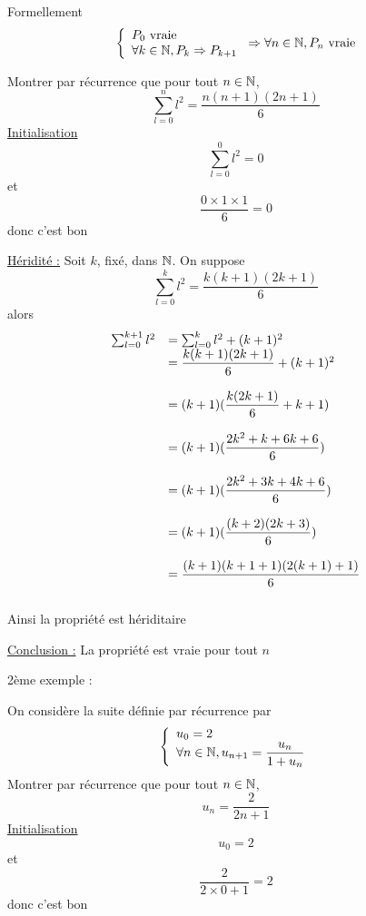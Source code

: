 Formellement 
$$\left\{\begin{array}{l} P_0 \text{ vraie} \\ \forall k \in \mathbb{N}, P_k \Rightarrow P_{k+1} \end{array}\right. \Rightarrow \forall n \in \mathbb{N}, P_n \text{ vraie}$$
\begin{exemples}
Montrer par récurrence que pour tout $n \in \mathbb{N}$, 
$$\sum_{l=0}^{n} l^2 = \dfrac{n(n+1)(2n+1)}{6}$$
\underline{Initialisation }
$$\sum_{l=0}^{0} l^2 = 0 $$
et 
$$\dfrac{0 \times 1 \times 1}{6} = 0$$
donc c'est bon\newline

\underline{Héridité :}\newline
Soit $k$, fixé, dans $\mathbb{N}$. On suppose 
$$\sum_{l=0}^{k} l^2 = \dfrac{k(k+1)(2k+1)}{6}$$
alors 
$$
\begin{array}{l l}
\sum_{l=0}^{k+1} l^2 &= \sum_{l=0}^{k} l^2 + (k+1)^2\\
&= \dfrac{k(k+1)(2k+1)}{6} + (k+1)^2\\ \\
&= (k+1)(\dfrac{k(2k+1)}{6} + k+1)\\ \\
&= (k+1)(\dfrac{2k^2 + k + 6 k +6}{6})\\ \\
&= (k+1)(\dfrac{2k^2 + 3k + 4k +6}{6})\\ \\
&= (k+1)(\dfrac{(k+2)(2k+3)}{6})\\ \\
&= \dfrac{(k+1)(k+1+1)(2(k+1)+1)}{6}\\ \\
\end{array}
$$
Ainsi la propriété est hériditaire\newline

\underline{Conclusion :}\newline 
La propriété est vraie pour tout $n$\newline

2ème exemple : \newline

On considère la suite définie par récurrence par 
$$\left\{ \begin{array}{l}
  u_0 = 2\\
  \forall n \in \mathbb{N}, u_{n+1} = \dfrac{u_n}{1+u_n}
\end{array}\right.$$
Montrer par récurrence que pour tout $n\in\mathbb{N}$, $$u_n = \dfrac{2}{2n+1}$$
\underline{Initialisation}
$$u_0 = 2$$
et 
$$\dfrac{2}{2\times 0 +1}= 2$$
donc c'est bon\newline


\end{exemples}
